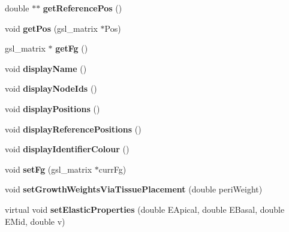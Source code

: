 \begin{DoxyCompactItemize}
\item 
\hypertarget{classShapeBase_a91ba74cc41917dbe821159023f1bf1ec}{}double $\ast$$\ast$ {\bfseries get\+Reference\+Pos} ()\label{classShapeBase_a91ba74cc41917dbe821159023f1bf1ec}

\item 
\hypertarget{classShapeBase_ab1906a5afda8fcbeef23010759f2538c}{}void {\bfseries get\+Pos} (gsl\+\_\+matrix $\ast$Pos)\label{classShapeBase_ab1906a5afda8fcbeef23010759f2538c}

\item 
\hypertarget{classShapeBase_a79889ef9cb7831a50e5391cb1cc19793}{}gsl\+\_\+matrix $\ast$ {\bfseries get\+Fg} ()\label{classShapeBase_a79889ef9cb7831a50e5391cb1cc19793}

\item 
\hypertarget{classShapeBase_ab8a7323c50767ecdc82d8d8ce411b264}{}void {\bfseries display\+Name} ()\label{classShapeBase_ab8a7323c50767ecdc82d8d8ce411b264}

\item 
\hypertarget{classShapeBase_a324f8fd5dd90c14b621b2f2ee3ec98db}{}void {\bfseries display\+Node\+Ids} ()\label{classShapeBase_a324f8fd5dd90c14b621b2f2ee3ec98db}

\item 
\hypertarget{classShapeBase_aca4d0f70caf459dc93f914ef7fc2a053}{}void {\bfseries display\+Positions} ()\label{classShapeBase_aca4d0f70caf459dc93f914ef7fc2a053}

\item 
\hypertarget{classShapeBase_af2d221cf63220dad3ecf139ffa164698}{}void {\bfseries display\+Reference\+Positions} ()\label{classShapeBase_af2d221cf63220dad3ecf139ffa164698}

\item 
\hypertarget{classShapeBase_aba6bb76d8adffaeb7ad36cce8a3f17ab}{}void {\bfseries display\+Identifier\+Colour} ()\label{classShapeBase_aba6bb76d8adffaeb7ad36cce8a3f17ab}

\item 
\hypertarget{classShapeBase_ad39c3f3a555a89e106c4afaaf81c72f6}{}void {\bfseries set\+Fg} (gsl\+\_\+matrix $\ast$curr\+Fg)\label{classShapeBase_ad39c3f3a555a89e106c4afaaf81c72f6}

\item 
\hypertarget{classShapeBase_a38a100fb162232636bf666eb1603f023}{}void {\bfseries set\+Growth\+Weights\+Via\+Tissue\+Placement} (double peri\+Weight)\label{classShapeBase_a38a100fb162232636bf666eb1603f023}

\item 
\hypertarget{classShapeBase_a948e9da80e40851c9813f8251d1979ec}{}virtual void {\bfseries set\+Elastic\+Properties} (double E\+Apical, double E\+Basal, double E\+Mid, double v)\label{classShapeBase_a948e9da80e40851c9813f8251d1979ec}


\end{DoxyCompactItemize}
